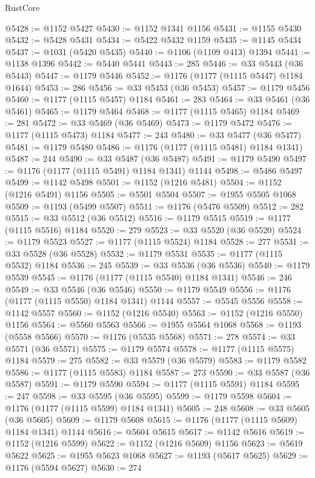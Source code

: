 \begin{lexlean}{RustCore}
\begin{coremodule}
@5428 := @1152 @5427
@5430 := @1152 @1341 @1156
@5431 := @1155 @5430
@5432 := @5428 @5431
@5434 := @5422 @5432 @1159
@5435 := @1145 @5434
@5437 := @1031 (@5420 @5435)
@5440 := @1106 (@1109 @413) @1394
@5441 := @1138 @1396
@5442 := @5440 @5441
@5443 := 285
@5446 := @33 @5443 (@36 @5443)
@5447 := @1179 @5446
@5452 := @1176 (@1177 (@1115 @5447) @1184 @1644)
@5453 := 286
@5456 := @33 @5453 (@36 @5453)
@5457 := @1179 @5456
@5460 := @1177 (@1115 @5457) @1184
@5461 := 283
@5464 := @33 @5461 (@36 @5461)
@5465 := @1179 @5464
@5468 := @1177 (@1115 @5465) @1184
@5469 := 281
@5472 := @33 @5469 (@36 @5469)
@5473 := @1179 @5472
@5476 := @1177 (@1115 @5473) @1184
@5477 := 243
@5480 := @33 @5477 (@36 @5477)
@5481 := @1179 @5480
@5486 := @1176 (@1177 (@1115 @5481) @1184 @1341)
@5487 := 244
@5490 := @33 @5487 (@36 @5487)
@5491 := @1179 @5490
@5497 := @1176 (@1177 (@1115 @5491) @1184 @1341) @1144
@5498 := @5486 @5497
@5499 := @1142 @5498
@5501 := @1152 (@1216 @5481)
@5504 := @1152 (@1216 @5491) @1156
@5505 := @5501 @5504
@5507 := @1955 @5505 @1068
@5509 := @1193 (@5499 @5507)
@5511 := @1176 (@5476 @5509)
@5512 := 282
@5515 := @33 @5512 (@36 @5512)
@5516 := @1179 @5515
@5519 := @1177 (@1115 @5516) @1184
@5520 := 279
@5523 := @33 @5520 (@36 @5520)
@5524 := @1179 @5523
@5527 := @1177 (@1115 @5524) @1184
@5528 := 277
@5531 := @33 @5528 (@36 @5528)
@5532 := @1179 @5531
@5535 := @1177 (@1115 @5532) @1184
@5536 := 245
@5539 := @33 @5536 (@36 @5536)
@5540 := @1179 @5539
@5545 := @1176 (@1177 (@1115 @5540) @1184 @1341)
@5546 := 246
@5549 := @33 @5546 (@36 @5546)
@5550 := @1179 @5549
@5556 := @1176 (@1177 (@1115 @5550) @1184 @1341) @1144
@5557 := @5545 @5556
@5558 := @1142 @5557
@5560 := @1152 (@1216 @5540)
@5563 := @1152 (@1216 @5550) @1156
@5564 := @5560 @5563
@5566 := @1955 @5564 @1068
@5568 := @1193 (@5558 @5566)
@5570 := @1176 (@5535 @5568)
@5571 := 278
@5574 := @33 @5571 (@36 @5571)
@5575 := @1179 @5574
@5578 := @1177 (@1115 @5575) @1184
@5579 := 275
@5582 := @33 @5579 (@36 @5579)
@5583 := @1179 @5582
@5586 := @1177 (@1115 @5583) @1184
@5587 := 273
@5590 := @33 @5587 (@36 @5587)
@5591 := @1179 @5590
@5594 := @1177 (@1115 @5591) @1184
@5595 := 247
@5598 := @33 @5595 (@36 @5595)
@5599 := @1179 @5598
@5604 := @1176 (@1177 (@1115 @5599) @1184 @1341)
@5605 := 248
@5608 := @33 @5605 (@36 @5605)
@5609 := @1179 @5608
@5615 := @1176 (@1177 (@1115 @5609) @1184 @1341) @1144
@5616 := @5604 @5615
@5617 := @1142 @5616
@5619 := @1152 (@1216 @5599)
@5622 := @1152 (@1216 @5609) @1156
@5623 := @5619 @5622
@5625 := @1955 @5623 @1068
@5627 := @1193 (@5617 @5625)
@5629 := @1176 (@5594 @5627)
@5630 := 274

\end{coremodule}
\end{lexlean}
